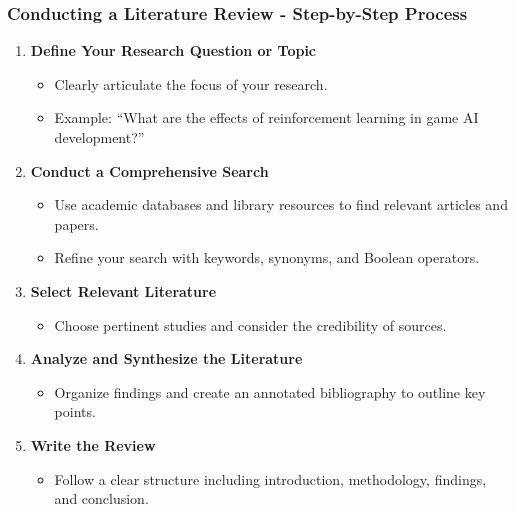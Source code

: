\documentclass[aspectratio=169]{beamer}
\begin{document}
\begin{frame}[fragile]
    \frametitle{Conducting a Literature Review - Step-by-Step Process}
    \begin{enumerate}
        \item \textbf{Define Your Research Question or Topic}
            \begin{itemize}
                \item Clearly articulate the focus of your research.
                \item Example: ``What are the effects of reinforcement learning in game AI development?''
            \end{itemize}
        
        \item \textbf{Conduct a Comprehensive Search}
            \begin{itemize}
                \item Use academic databases and library resources to find relevant articles and papers.
                \item Refine your search with keywords, synonyms, and Boolean operators.
            \end{itemize}
        
        \item \textbf{Select Relevant Literature}
            \begin{itemize}
                \item Choose pertinent studies and consider the credibility of sources.
            \end{itemize}
        
        \item \textbf{Analyze and Synthesize the Literature}
            \begin{itemize}
                \item Organize findings and create an annotated bibliography to outline key points.
            \end{itemize}
        
        \item \textbf{Write the Review}
            \begin{itemize}
                \item Follow a clear structure including introduction, methodology, findings, and conclusion.
            \end{itemize}
    \end{enumerate}
\end{frame}
\end{document}

